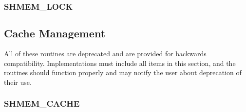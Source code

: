 \documentclass[10pt]{book}
\begin{document}
\subsubsection{\textbf{SHMEM\_LOCK}}\label{subsec:shmem_lock}






\subsection{Cache Management}
All of these routines are deprecated and are provided for backwards
compatibility.  Implementations must include all items in this section, and the
routines should function properly and may notify the user about deprecation of
their use.

\subsubsection{\textbf{SHMEM\_CACHE}}\label{subsec:shmem_cache}






\clearpage




\end{document}
